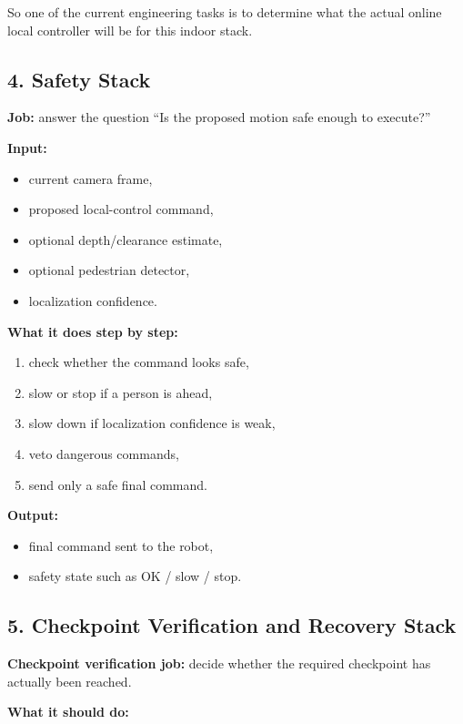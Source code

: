 \documentclass[11pt,a4paper]{article}
\begin{document}
So one of the current engineering tasks is to determine what the actual online
local controller will be for this indoor stack.


\subsection{4. Safety Stack}

\textbf{Job:} answer the question ``Is the proposed motion safe enough to execute?''

\textbf{Input:}

\begin{itemize}[nosep]
  \item current camera frame,
  \item proposed local-control command,
  \item optional depth/clearance estimate,
  \item optional pedestrian detector,
  \item localization confidence.
\end{itemize}

\textbf{What it does step by step:}

\begin{enumerate}[nosep]
  \item check whether the command looks safe,
  \item slow or stop if a person is ahead,
  \item slow down if localization confidence is weak,
  \item veto dangerous commands,
  \item send only a safe final command.
\end{enumerate}

\textbf{Output:}

\begin{itemize}[nosep]
  \item final command sent to the robot,
  \item safety state such as OK / slow / stop.
\end{itemize}


\subsection{5. Checkpoint Verification and Recovery Stack}

\textbf{Checkpoint verification job:} decide whether the required checkpoint has actually been reached.

\textbf{What it should do:}
\end{document}
